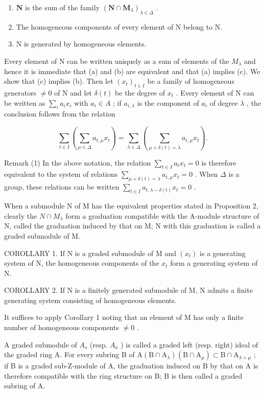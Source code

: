 \begin{enumerate}
\def\labelenumi{(\alph{enumi})}
\item
  \(\mathbf{N}\) is the sum of the family \((\mathbf{N} \cap \mathbf{M}_{\lambda})_{\lambda \in \Delta}\) .
\item
  The homogeneous components of every element of N belong to N.
\item
  N is generated by homogeneous elements.
\end{enumerate}

Every element of N can be written uniquely as a sum of elements of the \(M_{\lambda}\) and hence it is immediate that (a) and (b) are equivalent and that (a) implies (c). We show that (c) implies (b). Then let \((x_{t})_{t\in I}\) be a family of homogeneous generators \(\neq0\) of N and let \(\delta(t)\) be the degree of \(x_{t}\) . Every element of N can be written as \(\sum_{i}a_{i}x_{i}\) with \(a_{i}\in A\) ; if \(a_{i,\lambda}\) is the component of \(a_{i}\) of degree \(\lambda\) , the conclusion follows from the relation

\[
\sum_ {t \in I} \left(\sum_ {\mu \in \Delta} a _ {t, \mu} x _ {t}\right) = \sum_ {\lambda \in \Delta} \left(\sum_ {\mu + \delta (t) = \lambda} a _ {t, \mu} x _ {t}\right).
\]

Remark (1) In the above notation, the relation \(\sum_{t\in I}a_t x_t = 0\) is therefore equivalent to the system of relations \(\sum_{\mu +\delta (t) = \lambda}a_{t,\mu}x_{t} = 0\) . When \(\Delta\) is a group, these relations can be written \(\sum_{t\in I}a_{t,\lambda -\delta (t)}x_{t} = 0\) .

When a submodule N of M has the equivalent properties stated in Proposition 2, clearly the \(N \cap M_{\lambda}\) form a graduation compatible with the A-module structure of N, called the graduation induced by that on M; N with this graduation is called a graded submodule of M.

COROLLARY 1. If N is a graded submodule of M and \((x_{t})\) is a generating system of N, the homogeneous components of the \(x_{t}\) form a generating system of N.

COROLLARY 2. If N is a finitely generated submodule of M, N admits a finite generating system consisting of homogeneous elements.

It suffices to apply Corollary 1 noting that an element of M has only a finite number of homogeneous components \(\neq0\) .

A graded submodule of \(A_{s}\) (resp. \(A_{a}\) ) is called a graded left (resp. right) ideal of the graded ring A. For every subring B of \(\mathrm{A}(\mathrm{B} \cap \mathrm{A}_{\lambda})(\mathrm{B} \cap \mathrm{A}_{\mu}) \subset \mathrm{B} \cap \mathrm{A}_{\lambda + \mu}\) ; if B is a graded sub-Z-module of A, the graduation induced on B by that on A is therefore compatible with the ring structure on B; B is then called a graded subring of A.

